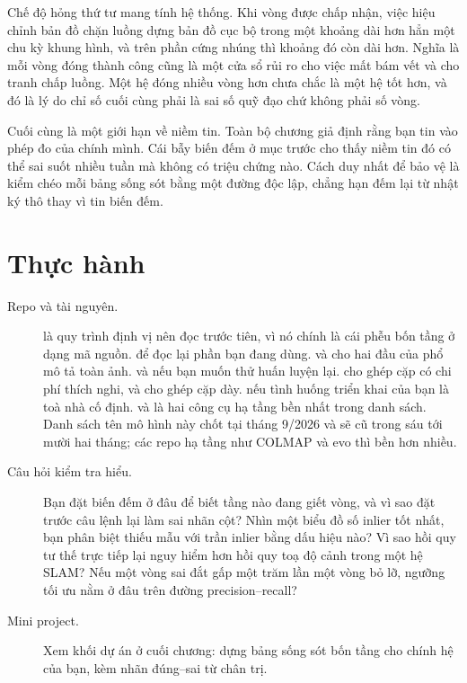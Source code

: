 \documentclass[../../deep_learning.tex]{subfiles}
\begin{document}
Chế độ hỏng thứ tư mang tính hệ thống. Khi vòng được chấp nhận, việc hiệu chỉnh bản đồ chặn luồng dựng bản đồ cục bộ trong một khoảng dài hơn hẳn một chu kỳ khung hình, và trên phần cứng nhúng thì khoảng đó còn dài hơn. Nghĩa là mỗi vòng đóng thành công cũng là một cửa sổ rủi ro cho việc mất bám vết và cho tranh chấp luồng. Một hệ đóng nhiều vòng hơn chưa chắc là một hệ tốt hơn, và đó là lý do chỉ số cuối cùng phải là sai số quỹ đạo chứ không phải số vòng.

Cuối cùng là một giới hạn về niềm tin. Toàn bộ chương giả định rằng bạn tin vào phép đo của chính mình. Cái bẫy biến đếm ở mục trước cho thấy niềm tin đó có thể sai suốt nhiều tuần mà không có triệu chứng nào. Cách duy nhất để bảo vệ là kiểm chéo mỗi bảng sống sót bằng một đường độc lập, chẳng hạn đếm lại từ nhật ký thô thay vì tin biến đếm.

\section{Thực hành}
\begin{description}
\item[Repo và tài nguyên.]  là quy trình định vị nên đọc trước tiên, vì nó chính là cái phễu bốn tầng ở dạng mã nguồn.  để đọc lại phần bạn đang dùng.  và  cho hai đầu của phổ mô tả toàn ảnh.  và  nếu bạn muốn thử huấn luyện lại.  cho ghép cặp có chi phí thích nghi, và  cho ghép cặp dày.  nếu tình huống triển khai của bạn là toà nhà cố định.  và  là hai công cụ hạ tầng bền nhất trong danh sách. Danh sách tên mô hình này chốt tại tháng 9/2026 và sẽ cũ trong sáu tới mười hai tháng; các repo hạ tầng như COLMAP và evo thì bền hơn nhiều.
\item[Câu hỏi kiểm tra hiểu.] Bạn đặt biến đếm ở đâu để biết tầng nào đang giết vòng, và vì sao đặt trước câu lệnh  lại làm sai nhãn cột? Nhìn một biểu đồ số inlier tốt nhất, bạn phân biệt thiếu mẫu với trần inlier bằng dấu hiệu nào? Vì sao hồi quy tư thế trực tiếp lại nguy hiểm hơn hồi quy toạ độ cảnh trong một hệ SLAM? Nếu một vòng sai đắt gấp một trăm lần một vòng bỏ lỡ, ngưỡng tối ưu nằm ở đâu trên đường precision--recall?
\item[Mini project.] Xem khối dự án ở cuối chương: dựng bảng sống sót bốn tầng cho chính hệ của bạn, kèm nhãn đúng--sai từ chân trị.
\end{description}
\end{document}
